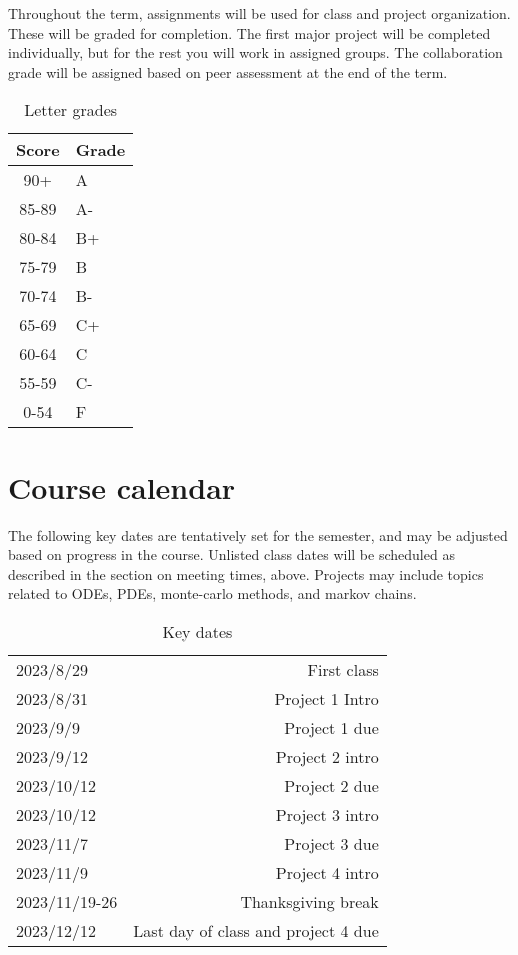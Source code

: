 \documentclass[12pt]{article}
\begin{document}
Throughout the term, assignments will be used for class and project organization. These will be graded for completion. The first major project will be completed individually, but for the rest you will work in assigned groups. The collaboration grade will be assigned based on peer assessment at the end of the term.

\begin{table}[h]
  \caption{Letter grades}
\begin{center}
  \begin{tabular}{cl}
	\toprule
	Score & Grade \\
	\midrule
	90+     &         A \\
   85-89    &         A-\\
   80-84    &         B+\\
   75-79    &         B	\\
   70-74    &         B-\\
   65-69    &         C+\\
   60-64    &         C	\\
   55-59    &         C-\\
   0-54    &         F \\
   \bottomrule
  \end{tabular}
\end{center}
\end{table}
\newpage
\section*{Course calendar}

The following key dates are tentatively set for the semester, and may be adjusted based on progress in the course. Unlisted class dates will be scheduled as described in the section on meeting times, above. Projects may include topics related to ODEs, PDEs, monte-carlo methods, and markov chains.
\begin{table}[h]
  \caption{Key dates}
\begin{center}
  \begin{tabular}{lr}
    \toprule
    2023/8/29 & First class \\
    2023/8/31 & Project 1 Intro \\
    2023/9/9 & Project 1 due \\
    2023/9/12 & Project 2 intro \\
    2023/10/12 & Project 2 due \\
    2023/10/12 & Project 3 intro \\
    2023/11/7 & Project 3 due \\
    2023/11/9 & Project 4 intro \\
    2023/11/19-26 & Thanksgiving break \\
    2023/12/12 & Last day of class and project 4 due \\
    \bottomrule
  \end{tabular}
\end{center}
\end{table}
\end{document}
